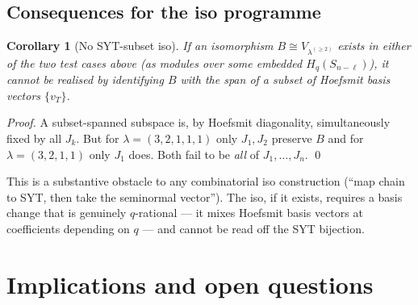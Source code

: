 \documentclass[11pt]{article}
\newtheorem{corollary}[theorem]{Corollary}
\theoremstyle{definition}
\begin{document}
\subsection{Consequences for the iso programme}

\begin{corollary}[No SYT-subset iso]\label{cor:no-subset}
If an isomorphism $B \cong V_{\lambda^{(\ge 2)}}$ exists in either of the
two test cases above (as modules over some embedded
$H_q(S_{n-\ell})$), it cannot be realised by identifying $B$ with the
span of a subset of Hoefsmit basis vectors $\{v_T\}$.
\end{corollary}

\begin{proof}
A subset-spanned subspace is, by Hoefsmit diagonality, simultaneously
fixed by all $J_k$. But for $\lambda = (3,2,1,1,1)$ only $J_1, J_2$
preserve $B$ and for $\lambda = (3,2,1,1)$ only $J_1$ does. Both fail
to be \emph{all} of $J_1, \ldots, J_n$. \qed
\end{proof}

This is a substantive obstacle to any combinatorial iso construction
(``map chain to SYT, then take the seminormal vector''). The iso, if
it exists, requires a basis change that is genuinely $q$-rational ---
it mixes Hoefsmit basis vectors at coefficients depending on $q$ ---
and cannot be read off the SYT bijection.

\section{Implications and open questions}\label{sec:implications}
\end{document}
